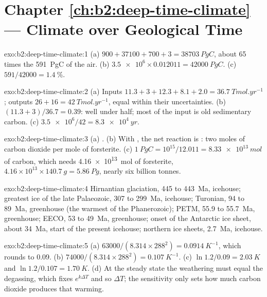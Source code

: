\section*{Chapter \ref{ch:b2:deep-time-climate} --- Climate over Geological Time}

\begin{solution}{exo:b2:deep-time-climate:1}
(a) $900 + 37100 + 700 + 3 = \qty{38703}{PgC}$, about 65 times the \qty{591}{PgC} of the air.
(b) $\num{3.5e6}\times0.012011 = \qty{42000}{PgC}$. (c) $591/42000 = \qty{1.4}{\percent}$.
\end{solution}

\begin{solution}{exo:b2:deep-time-climate:2}
(a) Inputs $11.3 + 3 + 12.3 + 8.1 + 2.0 = \qty{36.7}{Tmol.yr^{-1}}$; outputs $26 + 16 =
\qty{42}{Tmol.yr^{-1}}$, equal within their uncertainties. (b) $(11.3 + 3)/36.7 = 0.39$: well
under half; most of the input is old sedimentary carbon. (c) $\num{3.5e6}/42 = \qty{8.3e4}{yr}$.
\end{solution}

\begin{solution}{exo:b2:deep-time-climate:3}
(a) . (b) With , the net reaction is : two moles
of carbon dioxide per mole of forsterite. (c) $\qty{1}{PgC} = 10^{15}/12.011 =
\qty{8.33e13}{mol}$ of carbon, which needs \qty{4.16e13}{mol} of forsterite, $4.16\times10^{13}
\times\qty{140.7}{g} = \qty{5.86}{Pg}$, nearly six billion tonnes.
\end{solution}

\begin{solution}{exo:b2:deep-time-climate:4}
Hirnantian glaciation, 445 to \qty{443}{Ma}, icehouse; greatest ice of the late Palaeozoic, 307 to
\qty{299}{Ma}, icehouse; Turonian, 94 to \qty{89}{Ma}, greenhouse (the warmest of the Phanerozoic);
PETM, 55.9 to \qty{55.7}{Ma}, greenhouse; EECO, 53 to \qty{49}{Ma}, greenhouse; onset of the
Antarctic ice sheet, about \qty{34}{Ma}, start of the present icehouse; northern ice sheets,
\qty{2.7}{Ma}, icehouse.
\end{solution}

\begin{solution}{exo:b2:deep-time-climate:5}
(a) $63000/(8.314\times288^2) = \qty{0.0914}{K^{-1}}$, which rounds to 0.09. (b) $74000/(8.314
\times288^2) = \qty{0.107}{K^{-1}}$. (c) $\ln1.2/0.09 = \qty{2.03}{K}$ and $\ln 1.2/0.107 =
\qty{1.70}{K}$. (d) At the steady state the weathering must equal the degassing, which fixes $e^{k
\Delta T}$ and so $\Delta T$; the sensitivity only sets how much carbon dioxide produces that
warming.
\end{solution}

